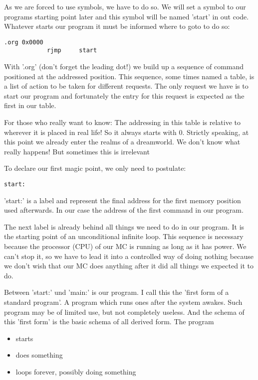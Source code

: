As we are forced to use symbols, we have to do so. We will set a symbol to our programs starting point later and this symbol will be named 'start' in out code. Whatever starts our program it must be informed where to goto to do so:

\begin{lstlisting}
.org 0x0000
            rjmp     start 
\end{lstlisting}

With '.org' (don't forget the leading dot!) we build up a sequence of command positioned at the addressed position. This sequence, some times named a table, is a list of action to be taken for different requests. The only request we have is to start our program and fortunately the entry for this request is expected as the first in our table.

For those who really want to know: The addressing in this table is relative to wherever it is placed in real life! So it always starts with 0. Strictly speaking, at this point we already enter the realms of a dreamworld. We don't know what really happens! But sometimes this is irrelevant

To declare our first magic point, we only need to postulate:

\begin{lstlisting}
start:
\end{lstlisting}

'start:'  is a label and represent the final address for the first memory position used afterwards. In our case the address of the first command in our program.

The next label is already behind all things we need to do in our program. It is the starting point of an unconditional infinite loop. This sequence is necessary because the processor (CPU) of our MC is running as long as it has power. We can't stop it, so we have to lead it into a controlled way of doing nothing because we don't wish that our MC does anything after it did all things we expected it to do.

Between 'start:' und 'main:' is our program. I call this the 'first form of a standard program'. A program which runs ones after the system awakes. Such program may be of limited use, but not completely useless. And the schema of this 'first form' is the basic schema of all derived form. The program 

\begin{itemize}
  \item{starts}
  \item{does something}
  \item{loops forever, possibly doing something}
\end{itemize}

